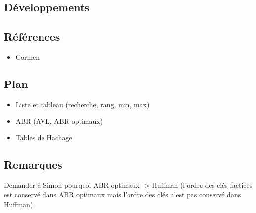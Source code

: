 \documentclass[../../agregation.tex]{subfiles}
\begin{document}

\subsection{Développements}

\dvts

\subsection{Références}

\begin{itemize}
	\item Cormen
\end{itemize}

\subsection{Plan}

\begin{itemize}
	\item Liste et tableau (recherche, rang, min, max)
	\item ABR (AVL, ABR optimaux)
	\item Tables de Hachage
\end{itemize}

\subsection{Remarques}

Demander à Simon pourquoi ABR optimaux -> Huffman (l'ordre des clés factices est conservé dans ABR optimaux mais l'ordre des clés n'est pas conservé dans Huffman)
\end{document}
